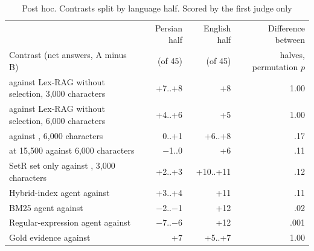 \begin{table}[tp]
\caption{Post hoc. Contrasts split by language half. Scored by the first judge only}
\label{tab:replication}
\centering
\small
\setlength{\tabcolsep}{4pt}
\begin{tabularx}{\textwidth}{@{}>{\raggedright\arraybackslash}Xrrr@{}}
\toprule
 & Persian half & English half & Difference between \\
Contrast (net answers, A minus B) & (of 45) & (of 45) & halves, permutation $p$ \\
\midrule
\lexb{} against Lex-RAG without selection, 3,000 characters & +7..+8 & +8 & 1.00 \\
\lexb{} against Lex-RAG without selection, 6,000 characters & +4..+6 & +5 & 1.00 \\
\hr{} against \hybrid{}, 6,000 characters & 0..+1 & +6..+8 & .17 \\
\hybrid{} at 15,500 against 6,000 characters & $-$1..0 & +6 & .11 \\
SetR set only against \hybrid{}, 3,000 characters & +2..+3 & +10..+11 & .12 \\
Hybrid-index agent against \hybrid{} & +3..+4 & +11 & .11 \\
BM25 agent against \hybrid{} & $-$2..$-$1 & +12 & .02 \\
Regular-expression agent against \hybrid{} & $-$7..$-$6 & +12 & .001 \\
Gold evidence against \hr{} & +7 & +5..+7 & 1.00 \\
\bottomrule
\end{tabularx}
\end{table}
